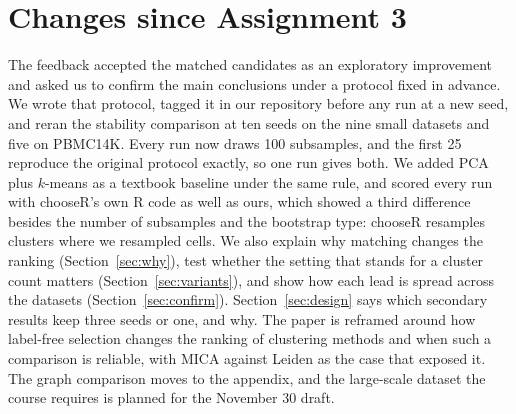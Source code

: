 \section*{Changes since Assignment 3}
The feedback accepted the matched candidates as an exploratory improvement and asked us to confirm the
main conclusions under a protocol fixed in advance. We wrote that protocol, tagged it in our repository before any run at a new seed, and reran the stability comparison at ten seeds on the nine small datasets and five
on PBMC14K. Every run now draws 100 subsamples, and the first 25 reproduce the original protocol exactly,
so one run gives both. We added PCA plus $k$-means as a textbook baseline under the same rule, and
scored every run with chooseR's own R code as well as ours, which showed a third difference besides the
number of subsamples and the bootstrap type: chooseR resamples clusters where we resampled cells. We also explain why matching changes the ranking (Section~\ref{sec:why}), test whether the setting that stands for a cluster count matters (Section~\ref{sec:variants}), and show how each lead is spread across the datasets (Section~\ref{sec:confirm}). Section~\ref{sec:design} says which secondary results keep three seeds or one, and why. The paper is reframed around
how label-free selection changes the ranking of clustering methods and when such a comparison is
reliable, with MICA against Leiden as the case that exposed it. The graph comparison moves to the
appendix, and the large-scale dataset the course requires is planned for the November 30 draft.
